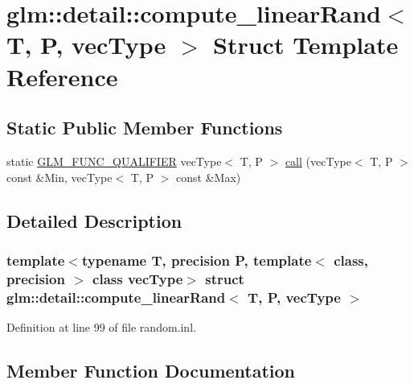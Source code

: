 \hypertarget{structglm_1_1detail_1_1compute__linear_rand}{}\section{glm\+::detail\+::compute\+\_\+linear\+Rand$<$ T, P, vec\+Type $>$ Struct Template Reference}
\label{structglm_1_1detail_1_1compute__linear_rand}
\subsection*{Static Public Member Functions}
\begin{DoxyCompactItemize}
\item 
static \mbox{\hyperlink{setup_8hpp_a33fdea6f91c5f834105f7415e2a64407}{G\+L\+M\+\_\+\+F\+U\+N\+C\+\_\+\+Q\+U\+A\+L\+I\+F\+I\+ER}} vec\+Type$<$ T, P $>$ \mbox{\hyperlink{structglm_1_1detail_1_1compute__linear_rand_a8eb63b699b38b830ef191d0ce323efd6}{call}} (vec\+Type$<$ T, P $>$ const \&Min, vec\+Type$<$ T, P $>$ const \&Max)
\end{DoxyCompactItemize}


\subsection{Detailed Description}
\subsubsection*{template$<$typename T, precision P, template$<$ class, precision $>$ class vec\+Type$>$\newline
struct glm\+::detail\+::compute\+\_\+linear\+Rand$<$ T, P, vec\+Type $>$}



Definition at line 99 of file random.\+inl.



\subsection{Member Function Documentation}
\mbox{\label{structglm_1_1detail_1_1compute__linear_rand_a8eb63b699b38b830ef191d0ce323efd6}} 
